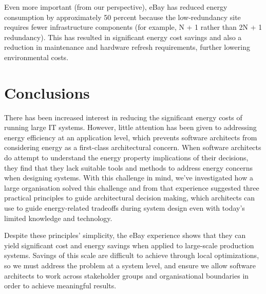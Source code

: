 Even more important (from our perspective), eBay has reduced energy consumption by approximately 50 percent because the low-redundancy site requires fewer infrastructure components (for example, N + 1 rather than 2N + 1 redundancy). This has resulted in  significant energy cost savings and also a reduction in maintenance and hardware refresh requirements, further lowering environmental costs.

\section{Conclusions}

There has been increased interest in reducing the significant energy costs of running large IT systems. However, little attention has been given to addressing energy efficiency at an application level, which prevents software architects from considering energy as a first-class architectural concern.  When software architects do attempt to understand the energy property implications of their decisions, they find that they lack suitable tools and methods to address energy concerns when designing systems. With this challenge in mind, we've investigated how a large organisation solved this challenge and from that experience suggested three practical principles to guide architectural decision making, which architects can use to guide energy-related tradeoffs during system design even with today's limited knowledge and technology.

Despite these principles' simplicity, the eBay experience shows that they can yield significant cost and energy savings when applied to large-scale production systems. Savings of this scale are difficult to achieve through local optimizations, so we must address the problem at a system level, and ensure we allow software architects to work across stakeholder groups and organisational boundaries in order to achieve meaningful results.
